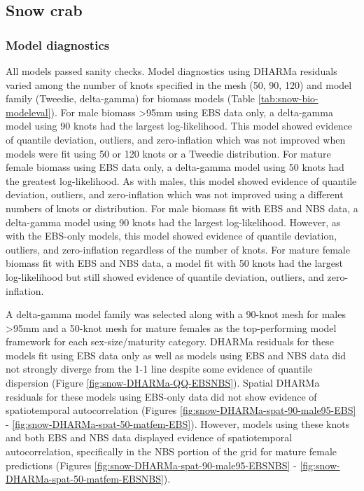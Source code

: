 \documentclass[
]{article}
\begin{document}
\subsection*{Snow crab}\label{snow-crab-1}

\subsubsection*{Model diagnostics}\label{model-diagnostics-1}

All models passed sanity checks. Model diagnostics using DHARMa residuals varied among the number of knots specified in the mesh (50, 90, 120) and model family (Tweedie, delta-gamma) for biomass models (Table \ref{tab:snow-bio-modeleval}). For male biomass \textgreater95mm using EBS data only, a delta-gamma model using 90 knots had the largest log-likelihood. This model showed evidence of quantile deviation, outliers, and zero-inflation which was not improved when models were fit using 50 or 120 knots or a Tweedie distribution. For mature female biomass using EBS data only, a delta-gamma model using 50 knots had the greatest log-likelihood. As with males, this model showed evidence of quantile deviation, outliers, and zero-inflation which was not improved using a different numbers of knots or distribution. For male biomass fit with EBS and NBS data, a delta-gamma model using 90 knots had the largest log-likelihood. However, as with the EBS-only models, this model showed evidence of quantile deviation, outliers, and zero-inflation regardless of the number of knots. For mature female biomass fit with EBS and NBS data, a model fit with 50 knots had the largest log-likelihood but still showed evidence of quantile deviation, outliers, and zero-inflation.

A delta-gamma model family was selected along with a 90-knot mesh for males \textgreater95mm and a 50-knot mesh for mature females as the top-performing model framework for each sex-size/maturity category. DHARMa residuals for these models fit using EBS data only as well as models using EBS and NBS data did not strongly diverge from the 1-1 line despite some evidence of quantile dispersion (Figure \ref{fig:snow-DHARMa-QQ-EBSNBS}). Spatial DHARMa residuals for these models using EBS-only data did not show evidence of spatiotemporal autocorrelation (Figures \ref{fig:snow-DHARMa-spat-90-male95-EBS} - \ref{fig:snow-DHARMa-spat-50-matfem-EBS}). However, models using these knots and both EBS and NBS data displayed evidence of spatiotemporal autocorrelation, specifically in the NBS portion of the grid for mature female predictions (Figures \ref{fig:snow-DHARMa-spat-90-male95-EBSNBS} - \ref{fig:snow-DHARMa-spat-50-matfem-EBSNBS}).
\end{document}
